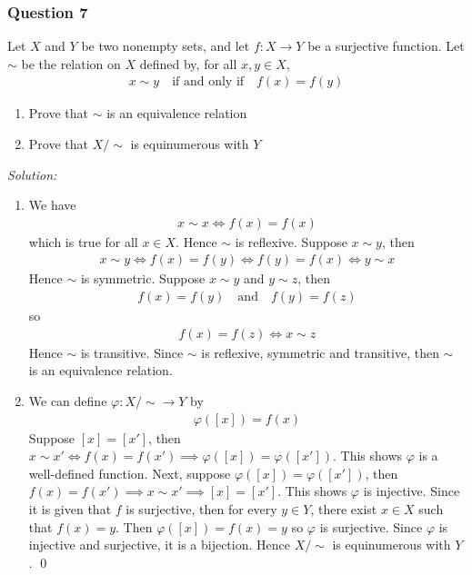 \documentclass[12pt]{article}
\begin{document}
\subsubsection*{Question 7}
Let $X$ and $Y$ be two nonempty sets, and let $f:X\to Y$ be a surjective function. Let $\sim$ be the relation on $X$ defined by, for all $x,y\in X$,
\begin{align*}
    x\sim y\quad \text{if and only if}\quad f(x)=f(y)
\end{align*}
\begin{enumerate}[label=\textbf{(\roman*)}]
\itemsep 0em
    \item Prove that $\sim$ is an equivalence relation
    \item Prove that $X/\sim$ is equinumerous with $Y$
\end{enumerate}
\emph{Solution:}
\begin{enumerate}[label=\textbf{(\roman*)}]
    \itemsep 0em
    \item We have 
\begin{align*}
    x\sim x\iff f(x)=f(x)
\end{align*}
which is true for all $x\in X$. Hence $\sim $ is reflexive.
\newline
\newline
Suppose $x\sim y$, then
\begin{align*}
    x\sim y\iff f(x)=f(y)\iff f(y)=f(x)\iff y\sim x
\end{align*}
Hence $\sim$ is symmetric.
\newline
\newline
Suppose $x\sim y$ and $y\sim z$, then
\begin{align*}
    f(x)=f(y)\quad\text{and}\quad f(y)=f(z)
\end{align*}
so
\begin{align*}
    f(x)=f(z)\iff x\sim z
\end{align*}
Hence $\sim$ is transitive. Since $\sim$ is reflexive, symmetric and transitive, then $\sim$ is an equivalence relation.
\item We can define $\varphi:X/\sim\to Y$ by
\begin{align*}
    \varphi([x])=f(x)
\end{align*}
Suppose $[x]=[x']$, then $x\sim x'\iff f(x)=f(x')\implies \varphi([x])=\varphi([x'])$. This shows $\varphi$ is a well-defined function.
\newline
\newline Next, suppose $\varphi([x])=\varphi([x'])$, then $f(x)=f(x')\implies x\sim x'\implies [x]=[x']$. This shows $\varphi$ is injective.
\newline
\newline Since it is given that $f$ is surjective, then for every $y\in Y$, there exist $x\in X$ such that $f(x)=y$. Then $ \varphi([x])=f(x)=y$ so $\varphi$ is surjective. Since $\varphi$ is injective and surjective, it is a bijection. Hence $X/\sim$ is equinumerous with $Y$. \qed 
\end{enumerate}
\end{document}
